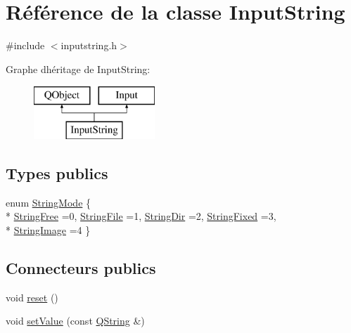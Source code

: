 \hypertarget{class_input_string}{}\section{Référence de la classe Input\+String}
\label{class_input_string}


{\ttfamily \#include $<$inputstring.\+h$>$}

Graphe d\textquotesingle{}héritage de Input\+String\+:\begin{figure}[H]
\begin{center}
\leavevmode
\includegraphics[height=2.000000cm]{class_input_string}
\end{center}
\end{figure}
\subsection*{Types publics}
\begin{DoxyCompactItemize}
\item 
enum \hyperlink{class_input_string_a7cfa8b8ad573f92ac8a7c850cf63b04b}{String\+Mode} \{ \\*
\hyperlink{class_input_string_a7cfa8b8ad573f92ac8a7c850cf63b04ba0cbd32588c030dc97ed6e1b72b1b30fe}{String\+Free} =0, 
\hyperlink{class_input_string_a7cfa8b8ad573f92ac8a7c850cf63b04bab80e3ab060857be7afbe794fafbf2e83}{String\+File} =1, 
\hyperlink{class_input_string_a7cfa8b8ad573f92ac8a7c850cf63b04bad821dc39434460a3a5ac9c2690c4fef0}{String\+Dir} =2, 
\hyperlink{class_input_string_a7cfa8b8ad573f92ac8a7c850cf63b04ba003b56b3a2598d5dc0d898e0ab139268}{String\+Fixed} =3, 
\\*
\hyperlink{class_input_string_a7cfa8b8ad573f92ac8a7c850cf63b04ba6d3e3657ef106bd471a2eddbafedafe1}{String\+Image} =4
 \}
\end{DoxyCompactItemize}
\subsection*{Connecteurs publics}
\begin{DoxyCompactItemize}
\item 
void \hyperlink{class_input_string_a1ef14657fbc414a6f15ca1f624d7da92}{reset} ()
\item 
void \hyperlink{class_input_string_aa5dd91fe260eb01b911a4206e6653449}{set\+Value} (const \hyperlink{class_q_string}{Q\+String} \&)
\end{DoxyCompactItemize}
